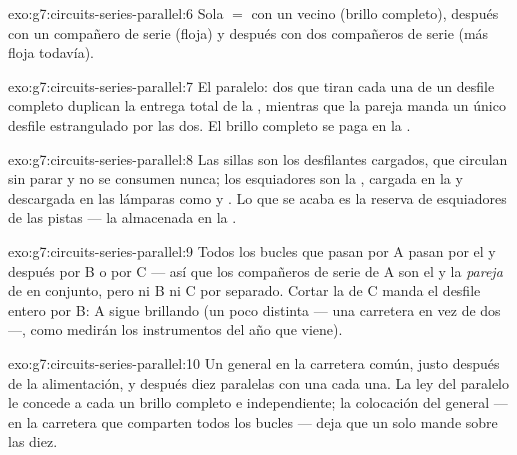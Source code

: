 \begin{solution}{exo:g7:circuits-series-parallel:6}
Sola $=$ con un vecino  (brillo completo), después con un
compañero de serie (floja) y después con dos compañeros de serie (más
floja todavía).
\end{solution}

\begin{solution}{exo:g7:circuits-series-parallel:7}
El paralelo: dos  que tiran cada una de un desfile completo
duplican la entrega total de la , mientras que la pareja  manda un único desfile estrangulado por las dos. El brillo
completo se paga en la .
\end{solution}

\begin{solution}{exo:g7:circuits-series-parallel:8}
Las sillas son los desfilantes cargados, que circulan sin parar y no
se consumen nunca; los esquiadores son la , cargada en la
 y descargada en las lámparas como  y . Lo que se
acaba es la reserva de esquiadores de las pistas --- la
 almacenada en la .
\end{solution}

\begin{solution}{exo:g7:circuits-series-parallel:9}
Todos los bucles que pasan por A pasan por el  y
después por B o por C --- así que los compañeros de serie de A son el
 y la \emph{pareja} de  en conjunto, pero ni B
ni C por separado. Cortar la  de C manda el desfile entero por
B: A sigue brillando (un poco distinta --- una carretera en vez de dos
---, como medirán los instrumentos del año que viene).
\end{solution}

\begin{solution}{exo:g7:circuits-series-parallel:10}
Un  general en la carretera común, justo después de la
alimentación, y después diez  paralelas con una
 cada una. La ley del paralelo le concede a cada
 un brillo completo e independiente; la colocación  del general --- en la carretera que comparten todos los bucles
--- deja que un solo  mande sobre las diez.
\end{solution}

